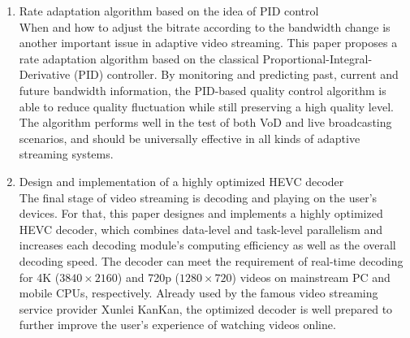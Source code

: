 \begin{eabstract}
\begin{enumerate}
\item {Rate adaptation algorithm based on the idea of PID control}\\
When and how to adjust the bitrate according to the bandwidth change is another important issue in adaptive video streaming. This paper proposes a rate adaptation algorithm based on the classical Proportional-Integral-Derivative (PID) controller. By monitoring and predicting past, current and future bandwidth information, the PID-based quality control algorithm is able to reduce quality fluctuation while still preserving a high quality level. The algorithm performs well in the test of both VoD and live broadcasting scenarios, and should be universally effective in all kinds of adaptive streaming systems.
\item {Design and implementation of a highly optimized HEVC decoder}\\
The final stage of video streaming is decoding and playing on the user's devices. For that, this paper designes and implements a highly optimized HEVC decoder, which combines data-level and task-level parallelism and increases each decoding module's computing efficiency as well as the overall decoding speed. The decoder can meet the requirement of real-time decoding for 4K ($3840 \times 2160$) and 720p ($1280 \times 720$) videos on mainstream PC and mobile CPUs, respectively. Already used by the famous video streaming service provider Xunlei KanKan, the optimized decoder is well prepared to further improve the user's experience of watching videos online.
\end{enumerate}
\end{eabstract}